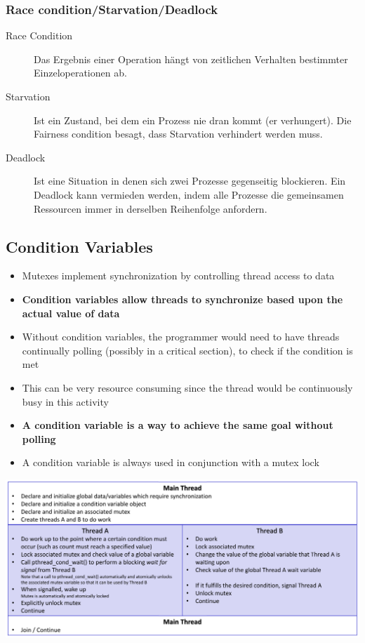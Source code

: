 \subsubsection{Race condition/Starvation/Deadlock}
\begin{description}
 \item[Race Condition]  Das Ergebnis einer Operation hängt von zeitlichen Verhalten bestimmter Einzeloperationen ab.
 \item[Starvation]      Ist ein Zustand, bei dem ein Prozess nie dran kommt (er verhungert). Die Fairness condition besagt, dass Starvation verhindert werden muss.
 \item[Deadlock]        Ist eine Situation in denen sich zwei Prozesse gegenseitig blockieren. Ein Deadlock kann vermieden werden, indem alle Prozesse die gemeinsamen Ressourcen immer in derselben Reihenfolge anfordern.
\end{description}

\subsection{Condition Variables}
\begin{itemize}
  \item Mutexes implement synchronization by controlling thread access to data
  \item \textbf{Condition variables allow threads to synchronize based upon the actual value of data}
  \item Without condition variables, the programmer would need to have threads continually polling (possibly in a critical section), to check if the condition is met
  \item This can be very resource consuming since the thread would be continuously busy in this activity
  \item \textbf{A condition variable is a way to achieve the same goal without polling}
  \item A condition variable is always used in conjunction with a mutex lock
\end{itemize}
\begin{center}
\begin{minipage}{0.8\linewidth}
  \includegraphics[width=\linewidth]{images/Concurrency/conditionVariablesAblauf}
\end{minipage}
\end{center}

